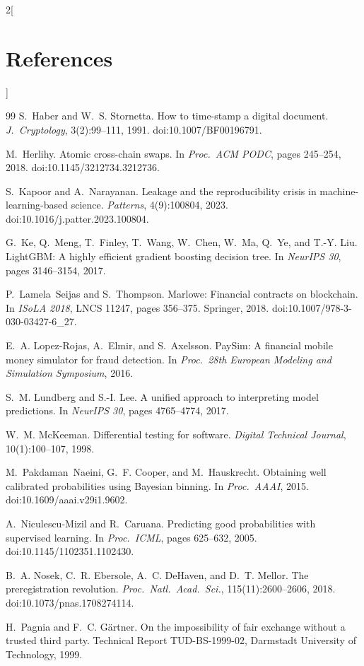 \documentclass[10pt,a4paper]{article}
\theoremstyle{tight}
\begin{document}
{\begin{multicols}{2}[\section*{\large References}]
\begin{thebibliography}{99}
 S.~Haber and W.~S. Stornetta. How to time-stamp a digital document. \emph{J.\ Cryptology},
3(2):99--111, 1991. doi:10.1007/BF00196791.

 M.~Herlihy. Atomic cross-chain swaps. In \emph{Proc.\ ACM PODC}, pages 245--254, 2018.
doi:10.1145/3212734.3212736.

 S.~Kapoor and A.~Narayanan. Leakage and the reproducibility crisis in machine-learning-based
science. \emph{Patterns}, 4(9):100804, 2023. doi:10.1016/j.patter.2023.100804.

 G.~Ke, Q.~Meng, T.~Finley, T.~Wang, W.~Chen, W.~Ma, Q.~Ye, and T.-Y. Liu. LightGBM: A highly
efficient gradient boosting decision tree. In \emph{NeurIPS 30}, pages 3146--3154, 2017.

 P.~Lamela~Seijas and S.~Thompson. Marlowe: Financial contracts on blockchain. In \emph{ISoLA 2018}, LNCS 11247, pages 356--375. Springer, 2018. doi:10.1007/978-3-030-03427-6\_27.

 E.~A. Lopez-Rojas, A.~Elmir, and S.~Axelsson. PaySim: A financial mobile money simulator
for fraud detection. In \emph{Proc.\ 28th European Modeling and Simulation Symposium}, 2016.

 S.~M. Lundberg and S.-I. Lee. A unified approach to interpreting model predictions. In
\emph{NeurIPS 30}, pages 4765--4774, 2017.

 W.~M. McKeeman. Differential testing for software. \emph{Digital Technical Journal},
10(1):100--107, 1998.

 M.~Pakdaman~Naeini, G.~F. Cooper, and M.~Hauskrecht. Obtaining well calibrated probabilities
using Bayesian binning. In \emph{Proc.\ AAAI}, 2015. doi:10.1609/aaai.v29i1.9602.

 A.~Niculescu-Mizil and R.~Caruana. Predicting good probabilities with supervised learning.
In \emph{Proc.\ ICML}, pages 625--632, 2005. doi:10.1145/1102351.1102430.

 B.~A. Nosek, C.~R. Ebersole, A.~C. DeHaven, and D.~T. Mellor. The preregistration revolution.
\emph{Proc.\ Natl.\ Acad.\ Sci.}, 115(11):2600--2606, 2018. doi:10.1073/pnas.1708274114.

 H.~Pagnia and F.~C. G\"artner. On the impossibility of fair exchange without a trusted third
party. Technical Report TUD-BS-1999-02, Darmstadt University of Technology, 1999.


\end{thebibliography}
\end{multicols}}
\end{document}
